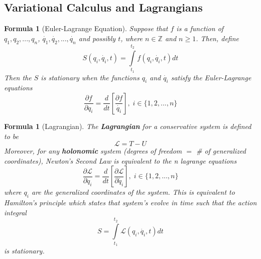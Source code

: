 \documentclass[12pt]{article}
\newtheorem{for}[thm]{Formula}
\theoremstyle{definition}
\theoremstyle{remark}
\numberwithin{equation}{section}
\newcommand\Z{\mathbb Z}    %
\begin{document}
\vspace{15pt}

\subsection{Variational Calculus and Lagrangians}

\begin{for}[Euler-Lagrange Equation]
        Suppose that $f$ is a function of $q_1,q_2,...,q_n$, $\dot{q_1},\dot{q_2},...,\dot{q_n}$ and possibly $t$, where $n \in \Z$ and $n \geq 1$. Then, define \begin{equation}
                S(q_i, \dot{q_i}, t) = \int\limits_{t_1}^{t_2}f(q_i,\dot{q_i}, t)dt
        \end{equation}
        Then the $S$ is stationary when the functions $q_i$ and $\dot{q_i}$ satisfy the Euler-Lagrange equations \begin{equation}
                \frac{\partial f}{\partial q_i} = \frac{d}{dt}\left[\frac{\partial f}{\dot{q_i}}\right],\;i \in \{1,2,...,n\}
        \end{equation}
\end{for}

\vspace{15pt}

\begin{for}[Lagrangian]
        The \textbf{Lagrangian} for a conservative system is defined to be \begin{equation}
                \mathcal{L} = T - U
        \end{equation}
        Moreover, for any \textbf{holonomic} system (degrees of freedom $=$ \# of generalized coordinates), Newton's Second Law is equivalent to the n lagrange equations \begin{equation}
                \frac{\partial \mathcal{L}}{\partial q_i} = \frac{d}{dt}\left[\frac{\partial \mathcal{L}}{\partial \dot{q_i}}\right],\;i \in \{1,2,...,n\}
        \end{equation}
        where $q_i$ are the generalized coordinates of the system. This is equivalent to Hamilton's principle which states that system's evolve in time such that the action integral \begin{equation}
                S = \int\limits_{t_1}^{t_2}\mathcal{L}(q_i,\dot{q_i},t)dt
        \end{equation}
        is stationary.
\end{for}

\vspace{15pt}
\end{document}
